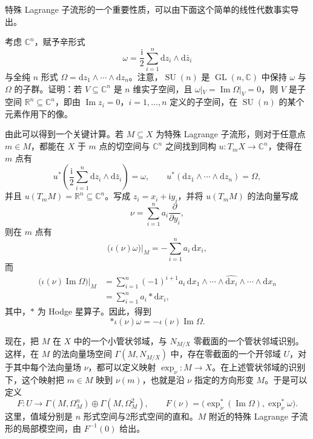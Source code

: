 特殊 Lagrange 子流形的一个重要性质，可以由下面这个简单的线性代数事实导出。

\begin{exercise}\label{exer:6.1}
考虑 $\mathbb C^n$，赋予辛形式
\[
\omega=\frac{\mathrm i}{2}\sum_{i=1}^n\mathrm dz_i\wedge\mathrm d\bar z_i
\]
与全纯 $n$ 形式 $\Omega=\mathrm dz_1\wedge\cdots\wedge\mathrm dz_n$。注意，$\operatorname{SU}(n)$ 是 $\operatorname{GL}(n,\mathbb C)$ 中保持 $\omega$ 与 $\Omega$ 的子群。证明：若 $V\subseteq\mathbb C^n$ 是 $n$ 维实子空间，且 $\omega|_V=\operatorname{Im}\Omega|_V=0$，则 $V$ 是子空间 $\mathbb R^n\subseteq\mathbb C^n$，即由 $\operatorname{Im}z_i=0$，$i=1,\ldots,n$ 定义的子空间，在 $\operatorname{SU}(n)$ 的某个元素作用下的像。
\end{exercise}

由此可以得到一个关键计算。若 $M\subseteq X$ 为特殊 Lagrange 子流形，则对于任意点 $m\in M$，都能在 $X$ 于 $m$ 点的切空间与 $\mathbb C^n$ 之间找到同构 $u\colon T_mX\to\mathbb C^n$，使得在 $m$ 点有
\[
u^*\!\left(\frac{\mathrm i}{2}\sum_{i=1}^n\mathrm dz_i\wedge\mathrm d\bar z_i\right)=\omega,
\qquad
u^*(\mathrm dz_1\wedge\cdots\wedge\mathrm dz_n)=\Omega,
\]
并且 $u(T_mM)=\mathbb R^n\subseteq\mathbb C^n$。写成 $z_i=x_i+\mathrm i y_i$，并将 $u(T_mM)$ 的法向量写成
\[
\nu=\sum_{i=1}^na_i\frac{\partial}{\partial y_i},
\]
则在 $m$ 点有
\[
\bigl(\iota(\nu)\omega\bigr)|_M=-\sum_{i=1}^na_i\,\mathrm dx_i,
\]
而
\[
\begin{aligned}
\bigl(\iota(\nu)\operatorname{Im}\Omega\bigr)|_M
&=\sum_{i=1}^n(-1)^{i+1}a_i\,
\mathrm dx_1\wedge\cdots\wedge\widehat{\mathrm dx_i}\wedge\cdots\wedge\mathrm dx_n\\
&=\sum_{i=1}^na_i*\mathrm dx_i,
\end{aligned}
\]
其中，$*$ 为 Hodge 星算子。因此，得到
\[
*\iota(\nu)\omega=-\iota(\nu)\operatorname{Im}\Omega.
\]

现在，把 $M$ 在 $X$ 中的一个小管状邻域，与 $N_{M/X}$ 零截面的一个管状邻域识别。这样，在 $M$ 的法向量场空间 $\Gamma(M,N_{M/X})$ 中，存在零截面的一个开邻域 $U$，对于其中每个法向量场 $\nu$，都可以定义映射 $\exp_\nu\colon M\to X$。在上述管状邻域的识别下，这个映射把 $m\in M$ 映到 $\nu(m)$，也就是沿 $\nu$ 指定的方向形变 $M$。于是可以定义
\[
F\colon U\longrightarrow\Gamma(M,\Omega_M^n)\oplus\Gamma(M,\Omega_M^2),
\qquad
F(\nu)=\bigl(\exp_\nu^*(\operatorname{Im}\Omega),\exp_\nu^*\omega\bigr).
\]
这里，值域分别是 $n$ 形式空间与2形式空间的直和。$M$ 附近的特殊 Lagrange 子流形的局部模空间，由 $F^{-1}(0)$ 给出。

